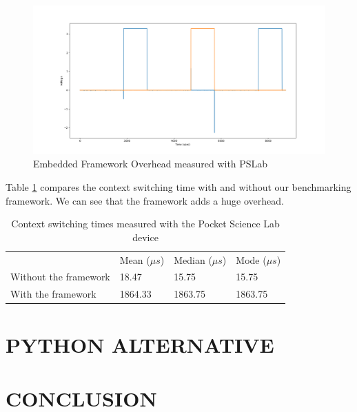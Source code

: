 \documentclass[a4paper, 10pt, conference]{ieeeconf}      %
\begin{document}
\begin{figure}[!h]
    \centering
    \includegraphics[scale=0.2]{framework_overhead.png}
    \caption{Embedded Framework Overhead measured with PSLab}
    \label{fig:framework_overhead}
\end{figure}

Table \ref{table:context_switching_times} compares the context switching time with and without our benchmarking framework.
We can see that the framework adds a huge overhead.


\begin{table}[!h]
    \centering
    \caption{Context switching times measured with the Pocket Science Lab device}
    \begin{tabular}{llll}
        \cline{2-4}
        & Mean ($\mu s$) & Median ($\mu s$) & Mode ($\mu s$) \\ \cline{2-4}
        Without the framework & 18.47 & 15.75 & 15.75 \\
        With the framework & 1864.33 & 1863.75 & 1863.75
    \end{tabular}
    \label{table:context_switching_times}
\end{table}

\section{PYTHON ALTERNATIVE}

    


\section{CONCLUSION}


\addtolength{\textheight}{-12cm}   %
\end{document}
